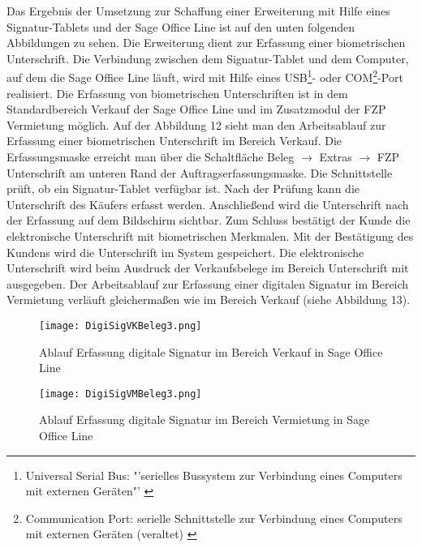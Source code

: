 Das Ergebnis der Umsetzung zur Schaffung einer Erweiterung mit Hilfe eines Signatur-Tablets und der Sage Office Line ist auf den unten folgenden Abbildungen zu sehen. Die Erweiterung dient zur Erfassung einer biometrischen Unterschrift. Die Verbindung zwischen dem Signatur-Tablet und dem Computer, auf dem die Sage Office Line läuft, wird mit Hilfe eines USB\footnote{Universal Serial Bus: "'serielles Bussystem zur Verbindung eines Computers mit externen Geräten"' \cite{USB}}- oder COM\footnote{Communication Port: serielle Schnittstelle zur Verbindung eines Computers mit externen Geräten (veraltet) \cite{COM}}-Port realisiert. Die Erfassung von biometrischen Unterschriften ist in dem Standardbereich Verkauf der Sage Office Line und im Zusatzmodul der FZP Vermietung möglich. Auf der Abbildung 12 sieht man den Arbeitsablauf zur Erfassung einer biometrischen Unterschrift im Bereich Verkauf. Die Erfassungsmaske erreicht man über die Schaltfläche Beleg $\rightarrow$ Extras $\rightarrow$ FZP Unterschrift am unteren Rand der Auftragserfassungsmaske. Die Schnittstelle prüft, ob ein Signatur-Tablet verfügbar ist. Nach der Prüfung kann die Unterschrift des Käufers erfasst werden. Anschließend wird die Unterschrift nach der Erfassung auf dem Bildschirm sichtbar. Zum Schluss bestätigt der Kunde die elektronische Unterschrift mit biometrischen Merkmalen. Mit der Bestätigung des Kundens wird die Unterschrift im System gespeichert. Die elektronische Unterschrift wird beim Ausdruck der Verkaufsbelege im Bereich Unterschrift mit ausgegeben. Der Arbeitsablauf zur Erfassung einer digitalen Signatur im Bereich Vermietung verläuft gleichermaßen wie im Bereich Verkauf (siehe Abbildung 13).

\begin{figure}[!ht]
    \centering
    \texttt{[image: DigiSigVKBeleg3.png]}
    \caption[Ablauf Erfassung digitale Signatur in Sage Office Line (Verkauf)]{\small{Ablauf Erfassung digitale Signatur im Bereich Verkauf in Sage Office Line}}
\end{figure}

\begin{figure}[!ht]
    \centering
    \texttt{[image: DigiSigVMBeleg3.png]}
    \caption[Ablauf Erfassung digitale Signatur in Sage Office Line (Vermietung)]{\small{Ablauf Erfassung digitale Signatur im Bereich Vermietung in Sage Office Line}}
\end{figure}
